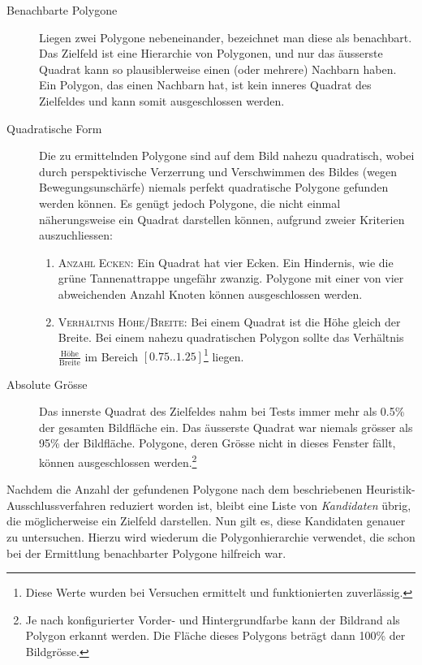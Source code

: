 \begin{description}
    \item[Benachbarte Polygone] Liegen zwei Polygone nebeneinander, bezeichnet man diese als benachbart. Das Zielfeld ist eine Hierarchie von Polygonen, und nur das äusserste Quadrat kann so plausiblerweise einen (oder mehrere) Nachbarn haben. Ein Polygon, das einen Nachbarn hat, ist kein inneres Quadrat des Zielfeldes und kann somit ausgeschlossen werden.
    \item [Quadratische Form] Die zu ermittelnden Polygone sind auf dem Bild nahezu quadratisch, wobei durch perspektivische Verzerrung und Verschwimmen des Bildes (wegen Bewegungsunschärfe) niemals perfekt quadratische Polygone gefunden werden können. Es genügt jedoch Polygone, die nicht einmal näherungsweise ein Quadrat darstellen können, aufgrund zweier Kriterien auszuchliessen:
        \begin{enumerate}
            \item \textsc{Anzahl Ecken}: Ein Quadrat hat vier Ecken. Ein Hindernis, wie die grüne Tannenattrappe ungefähr zwanzig. Polygone mit einer von vier abweichenden Anzahl Knoten können ausgeschlossen werden.
            \item \textsc{Verhältnis Höhe/Breite}: Bei einem Quadrat ist die Höhe gleich der Breite. Bei einem nahezu quadratischen Polygon sollte das Verhältnis $\frac{\text{Höhe}}{\text{Breite}}$ im Bereich $[0.75..1.25]$\footnote{Diese Werte wurden bei Versuchen ermittelt und funktionierten zuverlässig.} liegen.
        \end{enumerate}
    \item[Absolute Grösse] Das innerste Quadrat des Zielfeldes nahm bei Tests immer mehr als 0.5\% der gesamten Bildfläche ein. Das äusserste Quadrat war niemals grösser als 95\% der Bildfläche. Polygone, deren Grösse nicht in dieses Fenster fällt, können ausgeschlossen werden.\footnote{Je nach konfigurierter Vorder- und Hintergrundfarbe kann der Bildrand als Polygon erkannt werden. Die Fläche dieses Polygons beträgt dann 100\% der Bildgrösse.}
\end{description}

Nachdem die Anzahl der gefundenen Polygone nach dem beschriebenen Heuristik-Au\-sschluss\-ver\-fahren reduziert worden ist, bleibt eine Liste von \textit{Kandidaten} übrig, die möglicherweise ein Zielfeld darstellen. Nun gilt es, diese Kandidaten genauer zu untersuchen. Hierzu wird wiederum die Polygonhierarchie verwendet, die schon bei der Ermittlung benachbarter Polygone hilfreich war.

